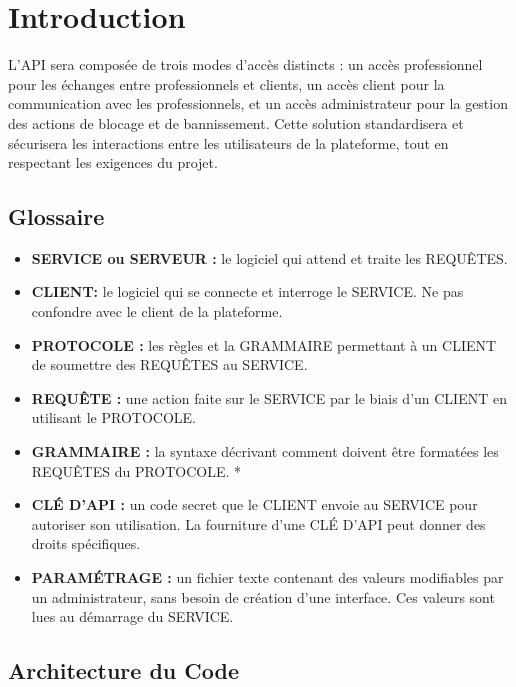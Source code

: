 \documentclass{report}
\begin{document}
\tableofcontents
\newpage
\chapter{Introduction}

L’API sera composée de trois modes d’accès distincts : un accès professionnel pour les échanges entre professionnels et clients, un accès client pour la communication avec les professionnels, et un accès administrateur pour la gestion des actions de blocage et de bannissement. Cette solution standardisera et sécurisera les interactions entre les utilisateurs de la plateforme, tout en respectant les exigences du projet.

\section{Glossaire}

\begin{itemize}
	\item \textbf{SERVICE ou SERVEUR :} le logiciel qui attend et traite les REQUÊTES.
	
	\item \textbf{CLIENT:} le logiciel qui se connecte et interroge le SERVICE. Ne pas confondre avec le client de la plateforme.
	
	\item \textbf{PROTOCOLE :} les règles et la GRAMMAIRE permettant à un CLIENT de soumettre des REQUÊTES au SERVICE. 
	
	\item \textbf{REQUÊTE :} une action faite sur le SERVICE par le biais d’un CLIENT en utilisant le PROTOCOLE.
	
	\item \textbf{GRAMMAIRE : } la syntaxe décrivant comment doivent être formatées les REQUÊTES du PROTOCOLE. *
	
	\item \textbf{CLÉ D’API :}   un code secret  que le CLIENT envoie au SERVICE pour autoriser son utilisation. La fourniture d’une CLÉ D’API peut donner des droits spécifiques. 
	
	\item \textbf{PARAMÉTRAGE :} un fichier texte contenant des valeurs modifiables par un administrateur, sans besoin de création d’une interface. Ces valeurs sont lues au démarrage du SERVICE.
	
\end{itemize}

\section{Architecture du Code}
\end{document}
